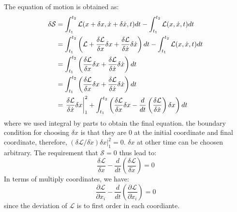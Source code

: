 \documentclass{article}
\renewcommand{\L}{\mathcal{L}}
\renewcommand{\S}{\mathcal{S}}
\newcommand{\dotx}{\dot{x}}
\begin{document}
The equation of motion is obtained as:
\begin{align}
    \delta\S &= \int_{t_1}^{t_2} \L(x+\delta x,\dotx + \delta \dotx,t) dt - \int_{t_1}^{t_2} \L(x,\dot{x},t) dt \notag \\
            &= \int_{t_1}^{t_2} \left( \L + \frac{\delta \L}{\delta x} \delta x + \frac{\delta \L}{\delta \dotx} \delta \dotx \right) dt - \int_{t_1}^{t_2} \L(x,\dot{x},t) dt \notag \\
            &= \int_{t_1}^{t_2}\left( \frac{\delta \L}{\delta x} \delta x + \frac{\delta \L}{\delta \dotx} \delta \dotx \right) dt \notag \\
            &= \int_{t_1}^{t_2}\left( \frac{\delta \L}{\delta x} \delta x + \frac{\delta \L}{\delta \dotx} \delta \dotx \right) dt \notag \\
            &= \left. \frac{\delta \L}{\delta \dotx} \delta x \right|_1^2
            + \int_{t_1}^{t_2}\left( \frac{\delta \L}{\delta x} \delta x - \frac{d}{dt}\left( \frac{\delta \L}{\delta \dotx} \right) \delta x \right) dt \label{eom} \\
\end{align}
where we used integral by parts to obtain the final equation. the boundary condition for choosing $\delta x$ is that they are $0$ at the initial coordinate and 
final coordinate, therefore, $ (\delta \L / \delta \dotx) \delta x |_1^2 = 0$. $\delta x$ at other time can be choosen arbitrary. The requirement that
$\S = 0$ thus lead to:
\begin{equation}
    \frac{\delta \L}{\delta x} - \frac{d}{dt}\left( \frac{\delta \L}{\delta \dotx} \right) = 0
\end{equation}
In terms of multiply coordinates, we have:
\begin{equation}
    \frac{\partial \L}{\partial x_i} - \frac{d}{dt}\left( \frac{\partial \L}{\partial \dotx_i} \right) = 0
\end{equation}
since the deviation of $\L$ is to first order in each coordiante.
\end{document}

